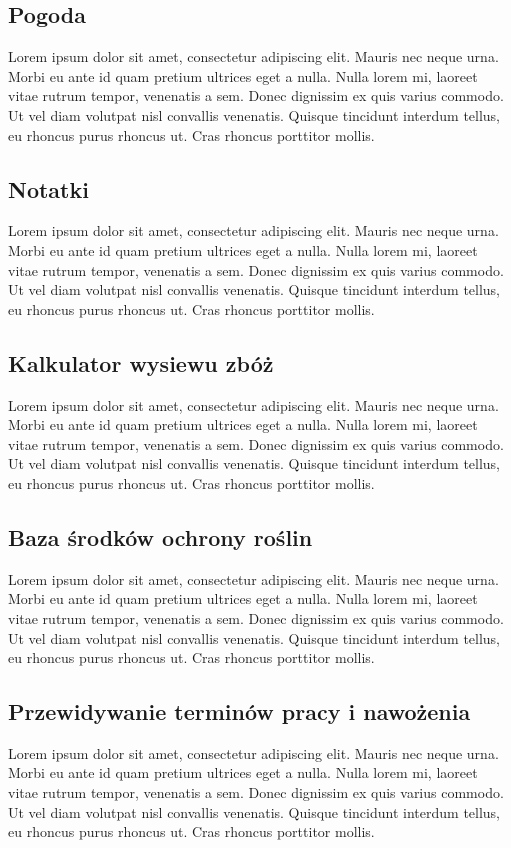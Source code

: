 \documentclass[a4paper,12pt,oneside]{book}
\begin{document}
	\subsection{Pogoda}
		Lorem ipsum dolor sit amet, consectetur adipiscing elit. Mauris nec neque urna. Morbi eu ante id quam pretium ultrices eget a nulla. Nulla lorem mi, laoreet vitae rutrum tempor, venenatis a sem. Donec dignissim ex quis varius commodo. Ut vel diam volutpat nisl convallis venenatis. Quisque tincidunt interdum tellus, eu rhoncus purus rhoncus ut. Cras rhoncus porttitor mollis.
	
	\subsection{Notatki}
		Lorem ipsum dolor sit amet, consectetur adipiscing elit. Mauris nec neque urna. Morbi eu ante id quam pretium ultrices eget a nulla. Nulla lorem mi, laoreet vitae rutrum tempor, venenatis a sem. Donec dignissim ex quis varius commodo. Ut vel diam volutpat nisl convallis venenatis. Quisque tincidunt interdum tellus, eu rhoncus purus rhoncus ut. Cras rhoncus porttitor mollis.
	
	\subsection{Kalkulator wysiewu zbóż}
		Lorem ipsum dolor sit amet, consectetur adipiscing elit. Mauris nec neque urna. Morbi eu ante id quam pretium ultrices eget a nulla. Nulla lorem mi, laoreet vitae rutrum tempor, venenatis a sem. Donec dignissim ex quis varius commodo. Ut vel diam volutpat nisl convallis venenatis. Quisque tincidunt interdum tellus, eu rhoncus purus rhoncus ut. Cras rhoncus porttitor mollis.
	
	\subsection{Baza środków ochrony roślin}
		Lorem ipsum dolor sit amet, consectetur adipiscing elit. Mauris nec neque urna. Morbi eu ante id quam pretium ultrices eget a nulla. Nulla lorem mi, laoreet vitae rutrum tempor, venenatis a sem. Donec dignissim ex quis varius commodo. Ut vel diam volutpat nisl convallis venenatis. Quisque tincidunt interdum tellus, eu rhoncus purus rhoncus ut. Cras rhoncus porttitor mollis.
	
	\subsection{Przewidywanie terminów pracy i nawożenia}
		Lorem ipsum dolor sit amet, consectetur adipiscing elit. Mauris nec neque urna. Morbi eu ante id quam pretium ultrices eget a nulla. Nulla lorem mi, laoreet vitae rutrum tempor, venenatis a sem. Donec dignissim ex quis varius commodo. Ut vel diam volutpat nisl convallis venenatis. Quisque tincidunt interdum tellus, eu rhoncus purus rhoncus ut. Cras rhoncus porttitor mollis.
	
\end{document}
